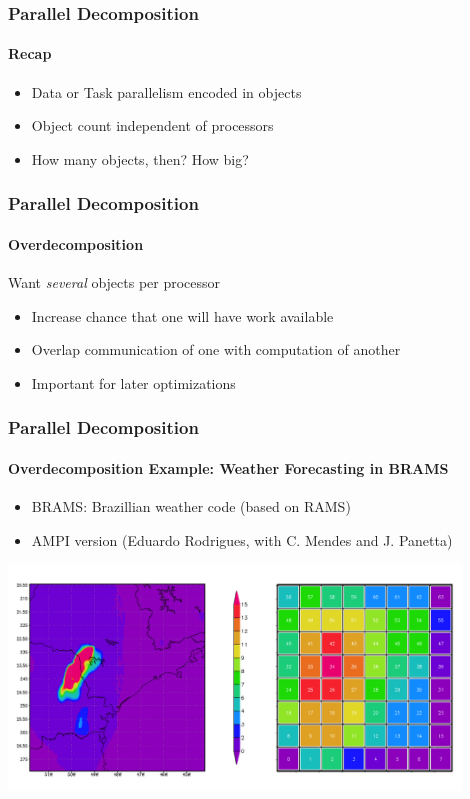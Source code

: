 \begin{frame}
\frametitle{Parallel Decomposition}
\framesubtitle{Recap}
\begin{itemize}
\item Data or Task parallelism encoded in objects
\item Object count independent of processors
\item How many objects, then? How big?
\end{itemize}
\end{frame}

\begin{frame}
\frametitle{Parallel Decomposition}
\framesubtitle{Overdecomposition}
Want \emph{several} objects per processor
\begin{itemize}
\item Increase chance that one will have work available
\item Overlap communication of one with computation of another
\item Important for later optimizations
\end{itemize}
\end{frame}

\begin{frame}[fragile]
\frametitle{Parallel Decomposition}
\framesubtitle{Overdecomposition Example: Weather Forecasting in BRAMS}
\begin{itemize}
 \item BRAMS: Brazillian weather code (based on RAMS)
 \item AMPI version (Eduardo Rodrigues, with C. Mendes and J. Panetta)
\end{itemize}
\includegraphics[width=0.9\textwidth]{../figures/bramsVisual.png}
\end{frame}


